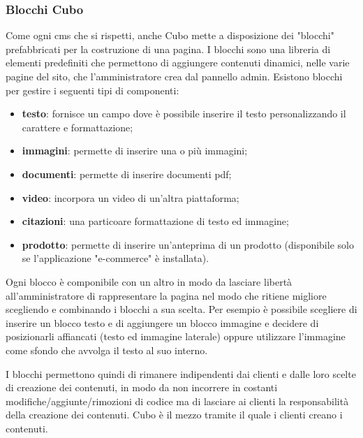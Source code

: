 \documentclass[12pt,a4paper]{article}
\begin{document}
\subsubsection{Blocchi Cubo}
Come ogni cms che si rispetti, anche Cubo mette a disposizione dei "blocchi" prefabbricati per la costruzione di una pagina. I blocchi sono una libreria di elementi predefiniti che permettono di aggiungere contenuti dinamici, nelle varie pagine del sito, che l'amministratore crea dal pannello admin.
Esistono blocchi per gestire i seguenti tipi di componenti:
\begin{itemize}
    \item \textbf{testo}: fornisce un campo dove è possibile inserire il testo personalizzando il carattere e formattazione;
    \item \textbf{immagini}: permette di inserire una o più immagini;
    \item \textbf{documenti}: permette di inserire documenti pdf;
    \item \textbf{video}: incorpora un video di un'altra piattaforma;
    \item \textbf{citazioni}: una particoare formattazione di testo ed immagine;
    \item \textbf{prodotto}: permette di inserire un'anteprima di un prodotto (disponibile solo se l'applicazione "e-commerce" è installata).
\end{itemize}
Ogni blocco è componibile con un altro in modo da lasciare libertà \break all'amministratore di rappresentare la pagina nel modo che ritiene migliore scegliendo e combinando i blocchi a sua scelta. Per esempio è possibile scegliere di  inserire un blocco testo e di aggiungere un blocco immagine e decidere di posizionarli affiancati (testo ed immagine laterale) oppure utilizzare l'immagine come sfondo che avvolga il testo al suo interno.

I blocchi permettono quindi di rimanere indipendenti dai clienti e dalle loro scelte di creazione dei contenuti, in modo da non incorrere in costanti modifiche/aggiunte/rimozioni di codice ma di lasciare ai clienti la responsabilità della creazione dei contenuti. Cubo è il mezzo tramite il quale i clienti creano i contenuti.
\end{document}
